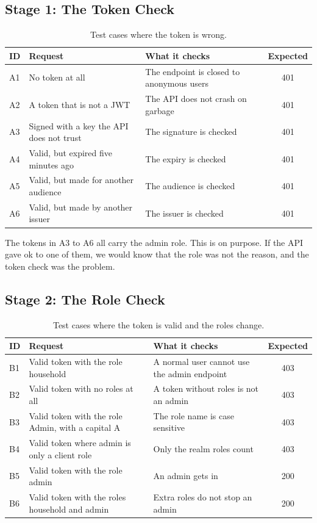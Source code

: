 \documentclass[a4paper,11pt]{article}
\begin{document}
\subsection{Stage 1: The Token Check}
\begin{table}[H]
\centering
\small
\begin{tabular}{@{}l p{4.8cm} p{4.6cm} c@{}}
\textbf{ID} & \textbf{Request} & \textbf{What it checks} & \textbf{Expected} \\
\hline
A1 & No token at all & The endpoint is closed to anonymous users & 401 \\
A2 & A token that is not a JWT & The API does not crash on garbage & 401 \\
A3 & Signed with a key the API does not trust & The signature is checked & 401 \\
A4 & Valid, but expired five minutes ago & The expiry is checked & 401 \\
A5 & Valid, but made for another audience & The audience is checked & 401 \\
A6 & Valid, but made by another issuer & The issuer is checked & 401 \\
\end{tabular}
\caption{Test cases where the token is wrong.}
\label{tab:admin-token-cases}
\end{table}

The tokens in A3 to A6 all carry the admin role. This is on purpose. If the API gave ok to one of them, we would know that the role was not the reason, and the token check was the problem.

\subsection{Stage 2: The Role Check}
\begin{table}[H]
\centering
\small
\begin{tabular}{@{}l p{4.8cm} p{4.6cm} c@{}}
\textbf{ID} & \textbf{Request} & \textbf{What it checks} & \textbf{Expected} \\
\hline
B1 & Valid token with the role household & A normal user cannot use the admin endpoint & 403 \\
B2 & Valid token with no roles at all & A token without roles is not an admin & 403 \\
B3 & Valid token with the role Admin, with a capital A & The role name is case sensitive & 403 \\
B4 & Valid token where admin is only a client role & Only the realm roles count & 403 \\
B5 & Valid token with the role admin & An admin gets in & 200 \\
B6 & Valid token with the roles household and admin & Extra roles do not stop an admin & 200 \\
\end{tabular}
\caption{Test cases where the token is valid and the roles change.}
\label{tab:admin-role-cases}
\end{table}
\end{document}
